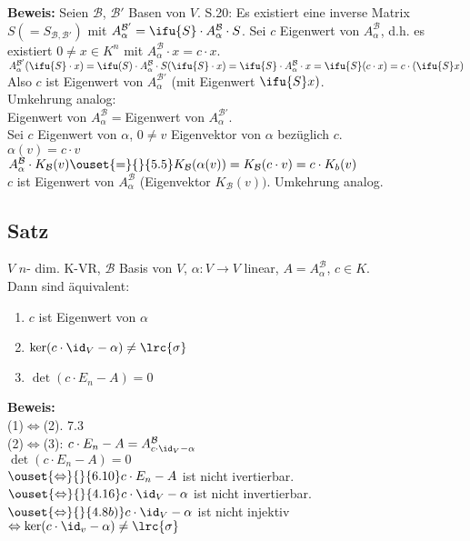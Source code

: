   \textbf{Beweis:} Seien ${\mathcal{B}}$, $\mathcal{B}'$ Basen von $V$. S.20:
  Es existiert eine inverse Matrix $S(=S_{\mathcal{B},\mathcal{B}'})$ mit
  $A_\alpha^{\mathcal{B}'}=\ifu{S}\cdot A_\alpha^{\mathcal{B}}\cdot S$. Sei $c$
  Eigenwert von $A_\alpha^{\mathcal{B}}$, d.h. es existiert $0\neq x\in K^n$ mit
  $A_\alpha^{\mathcal{B}}\cdot x=c\cdot x$.\\
  $A_\alpha^{\mathcal{B}'}(\ifu{S}\cdot x)=\ifu(S)\cdot
  A_\alpha^{\mathcal{B}}\cdot S(\ifu{S}\cdot x)=\ifu{S}\cdot
  A_\alpha^{\mathcal{B}}\cdot x=\ifu{S}(c\cdot x)=c\cdot(\ifu{S}x)$\\
  Also $c$ ist Eigenwert von $A_\alpha^{\mathcal{B}'}$ (mit Eigenwert
  $\ifu{S}x)$.\\
  Umkehrung analog:\\
  Eigenwert von $A_\alpha^{\mathcal{B}}=$Eigenwert von $A_\alpha^{\mathcal{B}'}$.\\
  Sei $c$ Eigenwert von $\alpha$, $0\neq v$ Eigenvektor von $\alpha$ bezüglich
  $c$.\\
  $\alpha(v)=c\cdot v$\\
  $A_\alpha^{\mathcal{B}}\cdot
  K_{\mathcal{B}}(v)\ouset{=}{}{5.5}K_{\mathcal{B}}(\alpha(v))=K_{\mathcal{B}}(c\cdot
  v)=c\cdot K_b(v)$\\
  $c$ ist Eigenwert von $A_\alpha^{\mathcal{B}}$ (Eigenvektor
  $K_{\mathcal{B}}(v))$. Umkehrung analog.

\subsection{Satz}
  $V$ $n$- dim. K-VR, $\mathcal{B}$ Basis von $V$, $\alpha:V\rightarrow V$ linear,
  $A=A_\alpha^{\mathcal{B}}$, $c\in K.$\\
  Dann sind äquivalent:
  \begin{enumerate}[(1)]
    \item $c$ ist Eigenwert von $\alpha$
    \item $\mbox{ker}(c\cdot\id_V-\alpha)\neq\lrc{\sigma}$
    \item $\det(c\cdot E_n-A)=0$
  \end{enumerate}

  \textbf{Beweis:}\\
  (1)$\Leftrightarrow$(2). 7.3\\
  (2)$\Leftrightarrow$(3): $c\cdot E_n-A=A_{c\cdot\id_V-\alpha}^{\mathcal{B}}$\\
  $\det(c\cdot E_n-A)=0$\\
  $\ouset{\Leftrightarrow}{}{6.10} c\cdot E_n-A$ ist nicht ivertierbar.\\
  $\ouset{\Leftrightarrow}{}{4.16} c\cdot\id_V-\alpha$ ist nicht invertierbar.\\
  $\ouset{\Leftrightarrow}{}{4.8b)} c\cdot\id_V-\alpha$ ist nicht injektiv\\
  $\Leftrightarrow \mbox{ker}(c\cdot\id_v-\alpha)\neq\lrc{\sigma}$

